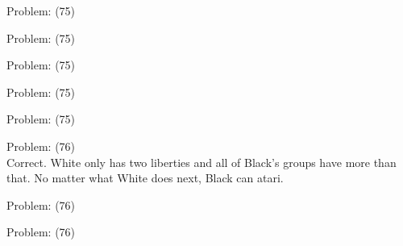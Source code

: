 \documentclass[11pt]{article}
\begin{document}
\begin{minipage}[t]{0.5\textwidth}
  {\centering
  
Problem: (75)\\
  }
\end{minipage}
\begin{minipage}[t]{0.5\textwidth}
  {\centering
  
Problem: (75)\\
  }
\end{minipage}
\begin{minipage}[t]{0.5\textwidth}
  {\centering
  
Problem: (75)\\
  }
\end{minipage}
\begin{minipage}[t]{0.5\textwidth}
  {\centering
  
Problem: (75)\\
  }
\end{minipage}
\begin{minipage}[t]{0.5\textwidth}
  {\centering
  
Problem: (75)\\
  }
\end{minipage}
\begin{minipage}[t]{0.5\textwidth}
  {\centering
  
Problem: (76)\\
Correct. White only has two liberties and all of Black's groups have more than that. No matter what White does next, Black can atari.\\
  }
\end{minipage}
\begin{minipage}[t]{0.5\textwidth}
  {\centering
  
Problem: (76)\\
  }
\end{minipage}
\begin{minipage}[t]{0.5\textwidth}
  {\centering
  
Problem: (76)\\
  }
\end{minipage}
\end{document}
